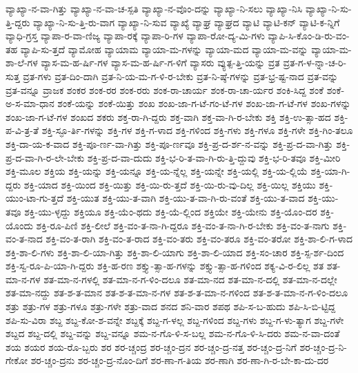 {ವ್ಯಾಖ್ಯಾ-ನ-ವಾ-ಗಿತ್ತು
ವ್ಯಾಖ್ಯಾ-ನ-ವಾ-ಚ-ಸ್ಪತಿ
ವ್ಯಾಖ್ಯಾ-ನ-ವೊಂ-ದನ್ನು
ವ್ಯಾಖ್ಯಾ-ನಿ-ಸಲು
ವ್ಯಾಖ್ಯಾ-ನಿಸಿ
ವ್ಯಾಖ್ಯಾ-ನಿ-ಸು-ತ್ತಿ-ದ್ದರು
ವ್ಯಾಖ್ಯಾ-ನಿ-ಸು-ತ್ತಿ-ರು-ವಾಗ
ವ್ಯಾಖ್ಯಾ-ನಿ-ಸುವ
ವ್ಯಾಖ್ಯೆ
ವ್ಯಾಘ್ರ
ವ್ಯಾಘ್ರದ
ವ್ಯಾಟಿ
ವ್ಯಾಟಿ-ಕನ್
ವ್ಯಾಟಿ-ಕ-ನ್ನಿಗೆ
ವ್ಯಾಧಿ-ಗ್ರಸ್ತ
ವ್ಯಾಪಾ-ರ-ವಾ-ಣಿಜ್ಯ
ವ್ಯಾಪಾ-ರಕ್ಕೆ
ವ್ಯಾಪಾ-ರಿ-ಗಳ
ವ್ಯಾಪಾ-ರೋ-ದ್ಯ-ಮಿ-ಗಳು
ವ್ಯಾಪಿ-ಸಿ-ಕೊಂ-ಡಿ-ರು-ವಂ-ತಹ
ವ್ಯಾಪಿ-ಸು-ತ್ತದೆ
ವ್ಯಾಮೋಹ
ವ್ಯಾಯಾಮ
ವ್ಯಾಯಾ-ಮ-ಗಳನ್ನು
ವ್ಯಾಯಾ-ಮದ
ವ್ಯಾಯಾ-ಮ-ವನ್ನು
ವ್ಯಾಯಾ-ಮ-ಶಾ-ಲೆ-ಗಳ
ವ್ಯಾಸ-ಮ-ಹ-ರ್ಷಿ-ಗಳ
ವ್ಯಾಸ-ಮ-ಹ-ರ್ಷಿ-ಗ-ಳಿಗೆ
ವ್ಯಾಸರು
ವ್ಯುತ್ಪ-ತ್ತಿ-ಯನ್ನು
ವ್ರತ
ವ್ರತ-ಗ-ಳ-ನ್ನಾ-ಚ-ರಿ-ಸುತ್ತ
ವ್ರತ-ಗಳು
ವ್ರತ-ದಿಂ-ದಾಗಿ
ವ್ರತ-ನಿ-ಯ-ಮ-ಗ-ಳಿ-ರ-ಬೇಕು
ವ್ರತ-ನಿ-ಷ್ಠೆ-ಗಳನ್ನು
ವ್ರತ-ಭ್ರ-ಷ್ಟ-ನಾದ
ವ್ರತ-ವನ್ನು
ವ್ರತ-ವನ್ನೂ
ವ್ರಾಜಕ
ಶಂಕರ
ಶಂಕ-ರರ
ಶಂಕ-ರರು
ಶಂಕ-ರಾ-ಚಾರ್ಯ
ಶಂಕ-ರಾ-ಚಾ-ರ್ಯರ
ಶಂಕಿ-ಸಿದ್ದ
ಶಂಕೆ
ಶಂಕೆ-ಅ-ಸ-ಮಾ-ಧಾನ
ಶಂಕೆ-ಯನ್ನು
ಶಂಕೆ-ಯಿತ್ತು
ಶಂಖ
ಶಂಖ-ಜಾ-ಗ-ಟೆ-ಗಂ-ಟೆ-ಗಳ
ಶಂಖ-ಜಾ-ಗ-ಟೆ-ಗಳ
ಶಂಖ-ಗಳನ್ನು
ಶಂಖ-ಜಾ-ಗ-ಟೆ-ಗಳ
ಶಂಖದ
ಶಕರು
ಶಕ್ತ-ರಾ-ಗಿ-ದ್ದರು
ಶಕ್ತ-ವಾಗಿ
ಶಕ್ತ-ವಾ-ಗಿ-ರ-ಬೇಕು
ಶಕ್ತಿ
ಶಕ್ತಿ-ಉ-ತ್ಸಾ-ಹದ
ಶಕ್ತಿ-ಪ-ವಿ-ತ್ರ-ತೆ
ಶಕ್ತಿ-ಸ್ಫೂ-ರ್ತಿ-ಗಳನ್ನು
ಶಕ್ತಿ-ಗಳ
ಶಕ್ತಿ-ಗ-ಳಾದ
ಶಕ್ತಿ-ಗಳಿಂದ
ಶಕ್ತಿ-ಗಳು
ಶಕ್ತಿ-ಗಳೂ
ಶಕ್ತಿ-ಗಳೇ
ಶಕ್ತಿ-ಗಿಂ-ತಲೂ
ಶಕ್ತಿ-ದಾ-ಯ-ಕ-ವಾದ
ಶಕ್ತಿ-ಪೂ-ರ್ಣ-ವಾ-ಗಿತ್ತು
ಶಕ್ತಿ-ಪೂ-ರ್ಣವೂ
ಶಕ್ತಿ-ಪ್ರ-ದ-ರ್ಶ-ನ-ವನ್ನು
ಶಕ್ತಿ-ಪ್ರ-ದ-ವಾ-ಗಿತ್ತು
ಶಕ್ತಿ-ಪ್ರ-ದ-ವಾ-ಗಿ-ರ-ಲೇ-ಬೇಕು
ಶಕ್ತಿ-ಪ್ರ-ದ-ವಾ-ದುದು
ಶಕ್ತಿ-ಭ-ರಿ-ತ-ವಾ-ಗಿ-ರು-ತ್ತಿ-ದ್ದುವು
ಶಕ್ತಿ-ಭ-ರಿ-ತವೂ
ಶಕ್ತಿ-ಮೀರಿ
ಶಕ್ತಿ-ಮೂಲ
ಶಕ್ತಿಯ
ಶಕ್ತಿ-ಯನ್ನು
ಶಕ್ತಿ-ಯನ್ನೂ
ಶಕ್ತಿ-ಯ-ನ್ನೆಲ್ಲ
ಶಕ್ತಿ-ಯನ್ನೇ
ಶಕ್ತಿ-ಯಲ್ಲಿ
ಶಕ್ತಿ-ಯ-ಲ್ಲಿಯೆ
ಶಕ್ತಿ-ಯಾ-ಗಿ-ದ್ದರು
ಶಕ್ತಿ-ಯಾದ
ಶಕ್ತಿ-ಯಿಂದ
ಶಕ್ತಿ-ಯಿತ್ತು
ಶಕ್ತಿ-ಯಿ-ರು-ತ್ತದೆ
ಶಕ್ತಿ-ಯಿ-ರು-ವು-ದಿಲ್ಲ
ಶಕ್ತಿ-ಯಿಲ್ಲ
ಶಕ್ತಿಯು
ಶಕ್ತಿ-ಯುಂ-ಟಾ-ಗು-ತ್ತದೆ
ಶಕ್ತಿ-ಯುತ
ಶಕ್ತಿ-ಯು-ತ-ವಾಗಿ
ಶಕ್ತಿ-ಯು-ತ-ವಾ-ಗಿ-ರು-ವಂತೆ
ಶಕ್ತಿ-ಯು-ತ-ವಾದ
ಶಕ್ತಿ-ಯು-ತವೂ
ಶಕ್ತಿ-ಯು-ಳ್ಳದ್ದು
ಶಕ್ತಿಯೂ
ಶಕ್ತಿ-ಯೆಂ-ಥದು
ಶಕ್ತಿ-ಯೆ-ಲ್ಲಿಂದ
ಶಕ್ತಿಯೇ
ಶಕ್ತಿ-ಯೇನು
ಶಕ್ತಿ-ಯೊಂ-ದರ
ಶಕ್ತಿ-ಯೊಂದು
ಶಕ್ತಿ-ರೂ-ಪಿಣಿ
ಶಕ್ತಿ-ಲೀಲೆ
ಶಕ್ತಿ-ವಂ-ತ-ನಾ-ಗಿ-ದ್ದರೂ
ಶಕ್ತಿ-ವಂ-ತ-ನಾ-ಗಿ-ರ-ಬೇಕು
ಶಕ್ತಿ-ವಂ-ತ-ನಾಗು
ಶಕ್ತಿ-ವಂ-ತ-ನಾದ
ಶಕ್ತಿ-ವಂ-ತ-ರಾಗಿ
ಶಕ್ತಿ-ವಂ-ತ-ರಾದ
ಶಕ್ತಿ-ವಂ-ತರು
ಶಕ್ತಿ-ವಂ-ತರೂ
ಶಕ್ತಿ-ವಂ-ತರೋ
ಶಕ್ತಿ-ಶಾ-ಲಿ-ಗ-ಳಾದ
ಶಕ್ತಿ-ಶಾ-ಲಿ-ಗಳು
ಶಕ್ತಿ-ಶಾ-ಲಿ-ಯಾ-ಗಿತ್ತು
ಶಕ್ತಿ-ಶಾ-ಲಿ-ಯಾಗು
ಶಕ್ತಿ-ಶಾ-ಲಿ-ಯಾದ
ಶಕ್ತಿ-ಸಂ-ಚಾರ
ಶಕ್ತಿ-ಸ್ಪ-ರ್ಶ-ದಿಂದ
ಶಕ್ತಿ-ಸ್ವ-ರೂ-ಪಿ-ಯಾ-ಗಿ-ದ್ದರು
ಶಕ್ತಿ-ಹ-ರಣ
ಶಕ್ತ್ಯು-ತ್ಸಾ-ಹ-ಗಳನ್ನು
ಶಕ್ತ್ಯು-ತ್ಸಾ-ಹ-ಗಳಿಂದ
ಶಕ್ಯ-ವಿ-ರ-ಲಿಲ್ಲ
ಶತ
ಶತ-ಮಾ-ನ-ಗಳ
ಶತ-ಮಾ-ನ-ಗಳಲ್ಲಿ
ಶತ-ಮಾ-ನ-ಗ-ಳಿಂ-ದಲೂ
ಶತ-ಮಾ-ನದ
ಶತ-ಮಾ-ನ-ದಲ್ಲಿ
ಶತ-ಮಾ-ನ-ದಲ್ಲೇ
ಶತ-ಮಾ-ನದ್ದು
ಶತ-ಶ-ತ-ಮಾನ
ಶತ-ಶ-ತ-ಮಾ-ನ-ಗಳ
ಶತ-ಶ-ತ-ಮಾ-ನ-ಗಳಿಂದ
ಶತ-ಶ-ತ-ಮಾ-ನ-ಗ-ಳಿಂ-ದಲೂ
ಶತ್ರು
ಶತ್ರು-ಗಳ
ಶತ್ರು-ಗಳೂ
ಶತ್ರು-ಗಳೇ
ಶತ್ರು-ವಾದ
ಶನದ
ಶನಿ-ವಾರ
ಶಪಥ
ಶಪಿ-ಸ-ಬ-ಹುದು
ಶಪಿ-ಸಿ-ಬಿ-ಟ್ಟಿದ್ದ
ಶಪಿ-ಸು-ವಿರಾ
ಶಬ್ದ
ಶಬ್ದ-ಕೋ-ಶ-ವನ್ನೇ
ಶಬ್ದಕ್ಕೆ
ಶಬ್ದ-ಗ-ಳಲ್ಲ
ಶಬ್ದ-ಗಳಿಂದ
ಶಬ್ದ-ಗಳು
ಶಬ್ದ-ಗ-ಳು-ತ್ಯಾಗ
ಶಬ್ದ-ಗಳೇ
ಶಬ್ದದ
ಶಬ್ದ-ದಲ್ಲಿ
ಶಬ್ದ-ವನ್ನು
ಶಬ್ದ-ವನ್ನೂ
ಶಮ-ನ-ಗೊ-ಳಿ-ಸ-ಬಲ್ಲ
ಶಮ-ನ-ಗೊ-ಳಿ-ಸಿ-ದರು
ಶಮ-ನ-ವಾ-ದಂತೆ
ಶಯ
ಶಯರ
ಶಯ-ರೊ-ಬ್ಬರು
ಶರ
ಶರ-ಚ್ಚಂದ್ರ
ಶರ-ಚ್ಚಂ-ದ್ರನ
ಶರ-ಚ್ಚಂ-ದ್ರ-ನತ್ತ
ಶರ-ಚ್ಚಂ-ದ್ರ-ನಿಗೆ
ಶರ-ಚ್ಚಂ-ದ್ರ-ನಿ-ಗೇಕೋ
ಶರ-ಚ್ಚಂ-ದ್ರನು
ಶರ-ಚ್ಚಂ-ದ್ರ-ನೊಂ-ದಿಗೆ
ಶರ-ಣಾ-ಗ-ತಿಯ
ಶರ-ಣಾಗಿ
ಶರ-ಣಾ-ಗಿ-ರ-ಬೇ-ಕಾ-ದು-ದರ
}
